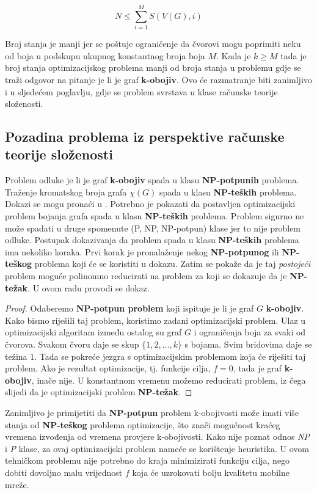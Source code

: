 \documentclass[times, utf8, diplomski, numeric]{fer}
\begin{document}
\begin{equation}
N \le \sum_{i=1}^{M} S(V(G), i)
\end{equation}

Broj stanja je manji jer se poštuje ograničenje da čvorovi mogu poprimiti neku od boja u podskupu ukupnog konstantnog broja boja $M$. Kada je $k\ge M$ tada je broj stanja optimizacijskog problema manji od broja stanja u problemu gdje se traži odgovor na pitanje je li je graf \textbf{k-obojiv}. Ovo će razmatranje biti zanimljivo i u sljedećem poglavlju, gdje se problem svrstava u klase računske teorije složenosti.

\subsection{Pozadina problema iz perspektive računske teorije složenosti}

Problem odluke je li je graf \textbf{k-obojiv} spada u klasu \textbf{NP-potpunih} problema. Traženje kromatskog broja grafa $\chi(G)$ spada u klasu \textbf{NP-teških} problema. Dokazi se mogu pronaći u \cite{lit16}. Potrebno je pokazati da postavljen optimizacijski problem bojanja grafa spada u klasu \textbf{NP-teških} problema. Problem sigurno ne može spadati u druge spomenute (P, NP, NP-potpun) klase jer to nije problem odluke.
Postupak dokazivanja da problem spada u klasu \textbf{NP-teških} problema ima nekoliko koraka. Prvi korak je pronalaženje nekog \textbf{NP-potpunog} ili \textbf{NP-teškog} problema koji će se koristiti u dokazu. Zatim se pokaže da je taj \emph{postojeći} problem moguće polinomno reducirati na problem za koji se dokazuje da je \textbf{NP-težak}. U ovom radu provodi se dokaz. 

\begin{proof}
Odaberemo \textbf{NP-potpun problem} koji ispituje je li je graf $G$ \textbf{k-obojiv}. Kako bismo riješili taj problem, koristimo zadani optimizacijski problem. Ulaz u optimizacijski algoritam između ostalog su graf $G$ i ograničenja boja za svaki od čvorova. Svakom čvoru daje se skup $\{1,2,...,k\}$ s bojama. Svim bridovima daje se težina $1$. Tada se pokreće jezgra s optimizacijskim problemom koja će riješiti taj problem. Ako je rezultat optimizacije, tj. funkcije cilja, $f=0$, tada je graf \textbf{k-obojiv}, inače nije. U konstantnom vremenu možemo reducirati problem, iz čega slijedi da je optimizacijski problem \textbf{NP-težak}.  
\end{proof}

Zanimljivo je primijetiti da \textbf{NP-potpun} problem k-obojivosti može imati više stanja od \textbf{NP-teškog} problema optimizacije, što znači mogućnost kraćeg vremena izvođenja od vremena provjere k-obojivosti. Kako nije poznat odnos \emph{NP} i \emph{P} klase, za ovaj optimizacijski problem nameće se korištenje heuristika. U ovom tehničkom problemu nije potrebno do kraja minimizirati funkciju cilja, nego dobiti dovoljno malu vrijednost $f$ koja će uzrokovati bolju kvalitetu mobilne mreže. 
\end{document}
